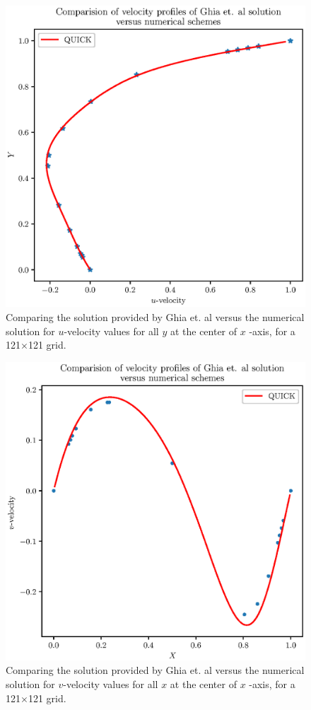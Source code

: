 \documentclass[12pt,a4paper,fleqn]{article}
\begin{document}
\begin{figure}[H]
    \centering
    \includegraphics[width=\linewidth]{n,xy=121_050213_qk_cavityFlowU.eps}
    \caption{Comparing the solution provided by Ghia et. al versus the numerical solution for \(u\)-velocity values for all \(y\) at the center of \(x\) -axis, for a 121\(\times\)121 grid.}
\end{figure}

\begin{figure}[H]
    \centering
    \includegraphics[width=\linewidth]{n,xy=121_050213_qk_cavityFlowV.eps}
    \caption{Comparing the solution provided by Ghia et. al versus the numerical solution for \(v\)-velocity values for all \(x\) at the center of \(x\) -axis, for a 121\(\times\)121 grid.}
\end{figure}
\end{document}
